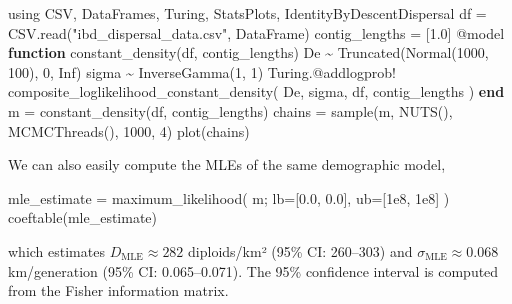 \documentclass[
]{article}
\newenvironment{Shaded}{\begin{snugshade}}{\end{snugshade}}
\newcommand{\BuiltInTok}[1]{\textcolor[rgb]{0.00,0.23,0.31}{#1}}
\newcommand{\ConstantTok}[1]{\textcolor[rgb]{0.56,0.35,0.01}{#1}}
\newcommand{\FloatTok}[1]{\textcolor[rgb]{0.68,0.00,0.00}{#1}}
\newcommand{\FunctionTok}[1]{\textcolor[rgb]{0.28,0.35,0.67}{#1}}
\newcommand{\ImportTok}[1]{\textcolor[rgb]{0.00,0.46,0.62}{#1}}
\newcommand{\KeywordTok}[1]{\textcolor[rgb]{0.00,0.23,0.31}{\textbf{#1}}}
\newcommand{\NormalTok}[1]{\textcolor[rgb]{0.00,0.23,0.31}{#1}}
\newcommand{\OperatorTok}[1]{\textcolor[rgb]{0.37,0.37,0.37}{#1}}
\newcommand{\PreprocessorTok}[1]{\textcolor[rgb]{0.68,0.00,0.00}{#1}}
\newcommand{\StringTok}[1]{\textcolor[rgb]{0.13,0.47,0.30}{#1}}
\begin{document}
\begin{Shaded}
\begin{Highlighting}[]
\ImportTok{using} \BuiltInTok{CSV}\NormalTok{, }\BuiltInTok{DataFrames}\NormalTok{, }\BuiltInTok{Turing}\NormalTok{, }\BuiltInTok{StatsPlots}\NormalTok{, }\BuiltInTok{IdentityByDescentDispersal}
\NormalTok{df }\OperatorTok{=}\NormalTok{ CSV.}\FunctionTok{read}\NormalTok{(}\StringTok{"ibd\_dispersal\_data.csv"}\NormalTok{, DataFrame)}
\NormalTok{contig\_lengths }\OperatorTok{=}\NormalTok{ [}\FloatTok{1.0}\NormalTok{]}
\PreprocessorTok{@model} \KeywordTok{function} \FunctionTok{constant\_density}\NormalTok{(df, contig\_lengths)}
\NormalTok{    De }\OperatorTok{\textasciitilde{}} \FunctionTok{Truncated}\NormalTok{(}\FunctionTok{Normal}\NormalTok{(}\FloatTok{1000}\NormalTok{, }\FloatTok{100}\NormalTok{), }\FloatTok{0}\NormalTok{, }\ConstantTok{Inf}\NormalTok{)}
\NormalTok{    sigma }\OperatorTok{\textasciitilde{}} \FunctionTok{InverseGamma}\NormalTok{(}\FloatTok{1}\NormalTok{, }\FloatTok{1}\NormalTok{)}
\NormalTok{    Turing.}\PreprocessorTok{@addlogprob}\NormalTok{! }\FunctionTok{composite\_loglikelihood\_constant\_density}\NormalTok{(}
\NormalTok{      De, sigma, df, contig\_lengths}
\NormalTok{    )}
\KeywordTok{end}
\NormalTok{m }\OperatorTok{=} \FunctionTok{constant\_density}\NormalTok{(df, contig\_lengths)}
\NormalTok{chains }\OperatorTok{=} \FunctionTok{sample}\NormalTok{(m, }\FunctionTok{NUTS}\NormalTok{(), }\FunctionTok{MCMCThreads}\NormalTok{(), }\FloatTok{1000}\NormalTok{, }\FloatTok{4}\NormalTok{)}
\FunctionTok{plot}\NormalTok{(chains)}
\end{Highlighting}
\end{Shaded}

We can also easily compute the MLEs of the same demographic model,

\begin{Shaded}
\begin{Highlighting}[]
\NormalTok{mle\_estimate }\OperatorTok{=} \FunctionTok{maximum\_likelihood}\NormalTok{(}
\NormalTok{  m; lb}\OperatorTok{=}\NormalTok{[}\FloatTok{0.0}\NormalTok{, }\FloatTok{0.0}\NormalTok{], ub}\OperatorTok{=}\NormalTok{[}\FloatTok{1e8}\NormalTok{, }\FloatTok{1e8}\NormalTok{]}
\NormalTok{)}
\FunctionTok{coeftable}\NormalTok{(mle\_estimate)}
\end{Highlighting}
\end{Shaded}

which estimates \(D_{\text{MLE}}\approx 282\) diploids/km² (95\% CI:
260--303) and \(\sigma_{\text{MLE}}\approx 0.068\) km/generation (95\%
CI: 0.065--0.071). The 95\% confidence interval is computed from the
Fisher information matrix.
\end{document}
